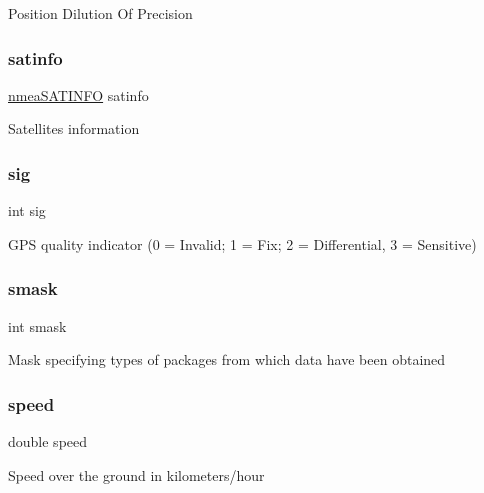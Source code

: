 Position Dilution Of Precision \mbox{\label{struct__nmea_i_n_f_o_a8a968bcc8b9f6e6cc691a1f593c86792}} 
\subsubsection{\texorpdfstring{satinfo}{satinfo}}
{\footnotesize\ttfamily \hyperlink{cfg__gps__module_8h_ae8abd5b6dfff0282bd633dbaac1343ec}{nmea\+S\+A\+T\+I\+N\+FO} satinfo}

Satellites information \mbox{\label{struct__nmea_i_n_f_o_a68be1f65e6d1f2949835d9b6b44bcf8e}} 
\subsubsection{\texorpdfstring{sig}{sig}}
{\footnotesize\ttfamily int sig}

G\+PS quality indicator (0 = Invalid; 1 = Fix; 2 = Differential, 3 = Sensitive) \mbox{\label{struct__nmea_i_n_f_o_a0b5d7bca329dcc3636c4e041c341ac24}} 
\subsubsection{\texorpdfstring{smask}{smask}}
{\footnotesize\ttfamily int smask}

Mask specifying types of packages from which data have been obtained \mbox{\label{struct__nmea_i_n_f_o_a6dc6e6f3c75c509ce943163afb5dade7}} 
\subsubsection{\texorpdfstring{speed}{speed}}
{\footnotesize\ttfamily double speed}

Speed over the ground in kilometers/hour \mbox{\label{struct__nmea_i_n_f_o_a3ddf15855460a4cadc548d695ca841dd}} 
